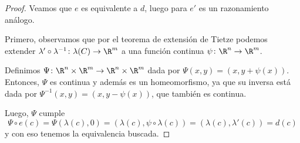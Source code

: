 \begin{proof}

Veamos que $e$ es equivalente a $d$, luego para $e'$ es un razonamiento análogo.

Primero, observamos que por el teorema de extensión de Tietze podemos extender $\lambda'\circ\lambda^{-1}\colon \lambda(C)\to \R^m$ a una función continua $\psi\colon \R^n\to\R^m$. 

Definimos $\Psi\colon\R^n\times\R^m\to\R^n\times\R^m$ dada por $\Psi(x,y)=\left(x,y+\psi(x)\right)$. Entonces, $\Psi$ es continua y además es un homeomorfismo, ya que su inversa está dada por $\Psi^{-1}(x,y)=\left(x,y-\psi(x)\right)$, que también es continua.

Luego, $\Psi$ cumple $$\Psi\circ e(c)=\Psi\left(\lambda(c),0\right)=\left(\lambda(c),\psi\circ \lambda(c)\right)=\left(\lambda(c),\lambda'(c)\right)=d(c)$$ y con eso tenemos la equivalencia buscada.

\end{proof}